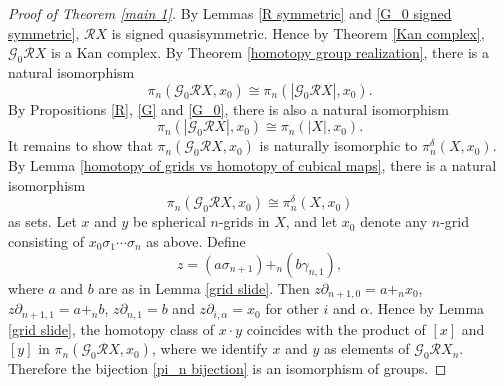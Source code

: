 \documentclass[oneside, 12pt]{amsart}
\numberwithin{equation}{section}
\theoremstyle{plain}
\theoremstyle{definition}
\theoremstyle{remark}
\begin{document}
	\begin{proof}
		[Proof of Theorem \ref{main 1}]
		By Lemmas \ref{R symmetric} and \ref{G_0 signed symmetric}, $\mathcal{R}X$ is signed quasisymmetric. Hence by Theorem \ref{Kan complex}, $\mathcal{G}_0\mathcal{R}X$ is a Kan complex. By Theorem \ref{homotopy group realization}, there is a natural isomorphism
		\[
		\pi_n(\mathcal{G}_0\mathcal{R}X,x_0)\cong\pi_n(|\mathcal{G}_0\mathcal{R}X|,x_0).
		\]
		By Propositions \ref{R}, \ref{G} and \ref{G_0}, there is also a natural isomorphism
		\[
		\pi_n(|\mathcal{G}_0\mathcal{R}X|,x_0)\cong\pi_n(|X|,x_0).
		\]
		It remains to show that $\pi_n(\mathcal{G}_0\mathcal{R}X,x_0)$ is naturally isomorphic to $\pi_n^\delta(X,x_0)$. By Lemma \ref{homotopy of grids vs homotopy of cubical maps}, there is a natural isomorphism
		\begin{equation}
			\label{pi_n bijection}
			\pi_n(\mathcal{G}_0\mathcal{R}X,x_0)\cong\pi_n^\delta(X,x_0)
		\end{equation}
		as sets. Let $x$ and $y$ be spherical $n$-grids in $X$, and let $x_0$ denote any $n$-grid consisting of $x_0\sigma_1\cdots\sigma_n$ as above. Define
		\[
		z=(a\sigma_{n+1})+_n(b\gamma_{n,1}),
		\]
		where $a$ and $b$ are as in Lemma \ref{grid slide}.
		Then $z\partial_{n+1,0}=a+_nx_0$, $z\partial_{n+1,1}=a+_nb$, $z\partial_{n,1}=b$ and $z\partial_{i,\alpha}=x_0$ for other $i$ and $\alpha$. Hence by Lemma \ref{grid slide}, the homotopy class of $x\cdot y$ coincides with the product of $[x]$ and $[y]$ in $\pi_n(\mathcal{G}_0\mathcal{R}X,x_0)$, where we identify $x$ and $y$ as elements of $\mathcal{G}_0\mathcal{R}X_n$. Therefore the bijection \eqref{pi_n bijection} is an isomorphism of groups.
	\end{proof}
\end{document}
